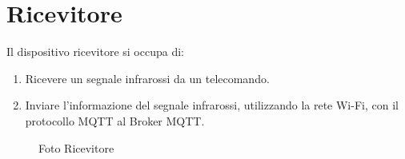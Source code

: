 \documentclass[a4paper]{article}
\begin{document}

\section{Ricevitore}

Il dispositivo ricevitore si occupa di:
\begin{enumerate}
    \item Ricevere un segnale infrarossi da un telecomando.
    \item Inviare l'informazione del segnale infrarossi, utilizzando la rete Wi-Fi, con il protocollo MQTT al Broker MQTT.
\end{enumerate}

\begin{figure}[H]
    \centering
    \qquad
    \qquad
    \caption{Foto Ricevitore}%
    \label{fig:example}%
\end{figure}
\end{document}
